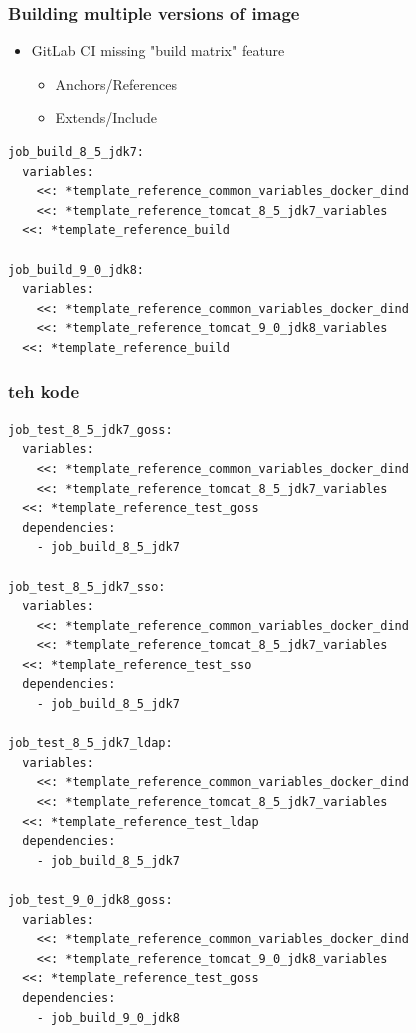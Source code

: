\documentclass[14pt,aspectratio=169]{beamer}
\begin{document}
{%
\begin{frame}[fragile]
  \frametitle{Building multiple versions of image}
  \begin{itemize}
    \item GitLab CI missing "build matrix" feature
    \begin{itemize}
      \item Anchors/References
      \item Extends/Include
    \end{itemize}
  \end{itemize}
  \begin{verbatim}
job_build_8_5_jdk7:
  variables:
    <<: *template_reference_common_variables_docker_dind
    <<: *template_reference_tomcat_8_5_jdk7_variables
  <<: *template_reference_build

job_build_9_0_jdk8:
  variables:
    <<: *template_reference_common_variables_docker_dind
    <<: *template_reference_tomcat_9_0_jdk8_variables
  <<: *template_reference_build
  \end{verbatim}
\end{frame}

\begin{frame}[fragile]
  \frametitle{teh kode}
  \begin{verbatim}
job_test_8_5_jdk7_goss:
  variables:
    <<: *template_reference_common_variables_docker_dind
    <<: *template_reference_tomcat_8_5_jdk7_variables
  <<: *template_reference_test_goss
  dependencies:
    - job_build_8_5_jdk7

job_test_8_5_jdk7_sso:
  variables:
    <<: *template_reference_common_variables_docker_dind
    <<: *template_reference_tomcat_8_5_jdk7_variables
  <<: *template_reference_test_sso
  dependencies:
    - job_build_8_5_jdk7

job_test_8_5_jdk7_ldap:
  variables:
    <<: *template_reference_common_variables_docker_dind
    <<: *template_reference_tomcat_8_5_jdk7_variables
  <<: *template_reference_test_ldap
  dependencies:
    - job_build_8_5_jdk7

job_test_9_0_jdk8_goss:
  variables:
    <<: *template_reference_common_variables_docker_dind
    <<: *template_reference_tomcat_9_0_jdk8_variables
  <<: *template_reference_test_goss
  dependencies:
    - job_build_9_0_jdk8


\end{verbatim}
\end{frame}}
\end{document}
